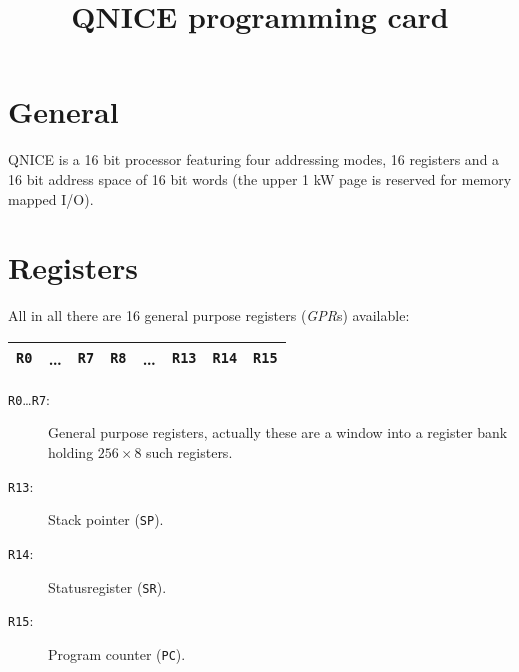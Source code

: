 \documentclass{leaflet}
\begin{document}
 \title{QNICE programming card}
 \maketitle
%
 \section{General}
  QNICE is a 16 bit processor featuring four addressing modes, 16 registers and
  a 16 bit address space of 16 bit words (the upper 1 kW page is reserved for
  memory mapped I/O).
%
 \section{Registers}
  All in all there are 16 general purpose registers (\emph{GPR}s) available:
  \begin{center}
   \begin{longtable}{|c|c|c||c|c|c|c|c|}
    \hline
    {\tt R0}&\dots&{\tt R7}&{\tt R8}&\dots&{\tt R13}&{\tt R14}&{\tt R15}\\
    \hline
   \end{longtable}
  \end{center}
  \begin{description}
   \item [\texttt{R0}\dots\texttt{R7}:] General purpose registers, actually 
    these are a window into a register bank holding $256\times 8$ such 
    registers.
   \item [\texttt{R13}:] Stack pointer (\texttt{SP}).
   \item [\texttt{R14}:] Statusregister (\texttt{SR}).
   \item [\texttt{R15}:] Program counter (\texttt{PC}).
  \end{description}
%
\end{document}
